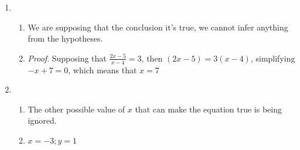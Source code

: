 \begin{enumerate}
\item
\begin{enumerate}
    \item We are supposing that the conclusion it's true, we cannot infer anything from the hypotheses.
    \item 
\textit{Proof}. Supposing that $\frac{2x-5}{x-4}=3$, then $(2x-5)=3(x-4)$, simplifying $-x+7=0$, which means that $x = 7$
\end{enumerate}
\item
\begin{enumerate}
    \item The other possible value of $x$ that can make the equation true is being ignored.
    \item $x = -3; y = 1$
\end{enumerate}
\end{enumerate}

